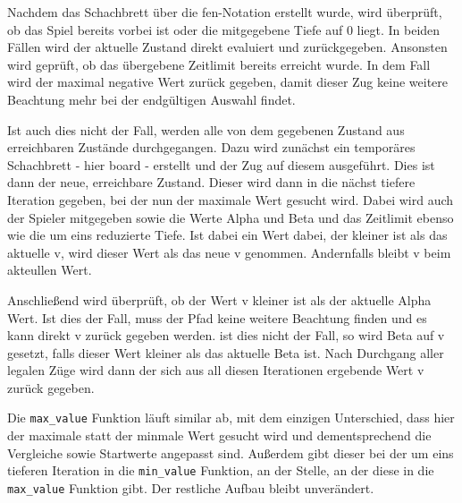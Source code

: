 Nachdem das Schachbrett über die fen-Notation erstellt wurde, wird
überprüft, ob das Spiel bereits vorbei ist oder die mitgegebene Tiefe
auf 0 liegt. In beiden Fällen wird der aktuelle Zustand direkt evaluiert
und zurückgegeben. Ansonsten wird geprüft, ob das übergebene Zeitlimit
bereits erreicht wurde. In dem Fall wird der maximal negative Wert
zurück gegeben, damit dieser Zug keine weitere Beachtung mehr bei der
endgültigen Auswahl findet.

Ist auch dies nicht der Fall, werden alle von dem gegebenen Zustand aus
erreichbaren Zustände durchgegangen. Dazu wird zunächst ein temporäres
Schachbrett - hier board - erstellt und der Zug auf diesem ausgeführt.
Dies ist dann der neue, erreichbare Zustand. Dieser wird dann in die
nächst tiefere Iteration gegeben, bei der nun der maximale Wert gesucht
wird. Dabei wird auch der Spieler mitgegeben sowie die Werte Alpha und
Beta und das Zeitlimit ebenso wie die um eins reduzierte Tiefe. Ist
dabei ein Wert dabei, der kleiner ist als das aktuelle v, wird dieser
Wert als das neue v genommen. Andernfalls bleibt v beim akteullen Wert.

Anschließend wird überprüft, ob der Wert v kleiner ist als der aktuelle
Alpha Wert. Ist dies der Fall, muss der Pfad keine weitere Beachtung
finden und es kann direkt v zurück gegeben werden. ist dies nicht der
Fall, so wird Beta auf v gesetzt, falls dieser Wert kleiner als das
aktuelle Beta ist. Nach Durchgang aller legalen Züge wird dann der sich
aus all diesen Iterationen ergebende Wert v zurück gegeben.

Die \texttt{max\_value} Funktion läuft similar ab, mit dem einzigen
Unterschied, dass hier der maximale statt der minmale Wert gesucht wird
und dementsprechend die Vergleiche sowie Startwerte angepasst sind.
Außerdem gibt dieser bei der um eins tieferen Iteration in die
\texttt{min\_value} Funktion, an der Stelle, an der diese in die
\texttt{max\_value} Funktion gibt. Der restliche Aufbau bleibt
unverändert.

